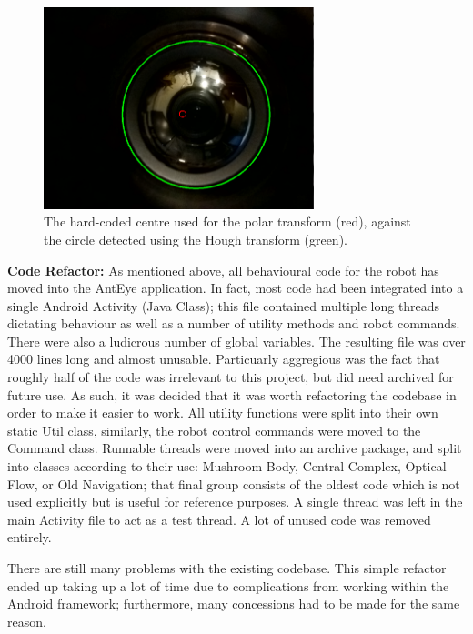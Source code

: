 \documentclass[a4paper,11pt,twoside,openright]{article}
\begin{document}
\begin{figure}
  \centering
  \includegraphics[width=0.7\textwidth]{Centre}
  \caption{\label{fig:centre} The hard-coded centre used for the polar transform
    (red), against the circle detected using the Hough transform (green).
   }
\end{figure}

\textbf{Code Refactor:}
As mentioned above, all behavioural code for the robot has moved into the AntEye
application. In fact, most code had been integrated into a single Android
Activity (Java Class); this file contained multiple long threads dictating
behaviour as well as a number of utility methods and robot commands. There
were also a ludicrous number of global variables. The resulting file was over
4000 lines long and almost unusable. Particuarly aggregious was the fact that
roughly half of the code was irrelevant to this project, but did need archived
for future use. As such, it was decided that it was worth refactoring the
codebase in order to make it easier to work. All utility functions were split
into their own static Util class, similarly, the robot control commands were
moved to the Command class. Runnable threads were moved into an archive
package, and split into classes according to their use: Mushroom Body,
Central Complex, Optical Flow, or Old Navigation; that final group consists of
the oldest code which is not used explicitly but is useful for reference
purposes. A single thread was left in the main Activity file to act as a test
thread. A lot of unused code was removed entirely.
\newline
\par

There are still many problems with the existing codebase. This simple refactor
ended up taking up a lot of time due to complications from working within the
Android framework; furthermore, many concessions had to be made for the same
reason.
\newline
\par
\end{document}
